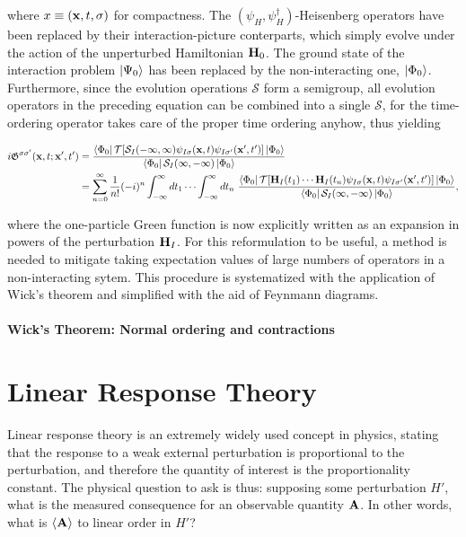 \documentclass{homework}
\begin{document}
where $x \equiv ({\bf x}, t, \sigma)$ for compactness. The $(\psi_H, \psi_H^\dagger)$-Heisenberg operators have been replaced by their interaction-picture conterparts, which simply evolve under the action of the unperturbed Hamiltonian ${\bf H}_0$. The ground state of the interaction problem $\ket{\Psi_0}$ has been replaced by the non-interacting one, $\ket{\Phi_0}$. Furthermore, since the evolution operations $\mathcal{S}$ form a semigroup, all evolution operators in the preceding equation can be combined into a single $\mathcal{S}$, for the time-ordering operator takes care of the proper time ordering anyhow, thus yielding 

\begin{equation}
\begin{split}
     i \mathfrak{G}^{\sigma \sigma'}({\bf x}, t; {\bf x}', t') &= \frac{\bra{\Phi_0}  \mathcal{T} [\mathcal{S}_I(-\infty, \infty) \psi_{I \sigma}({\bf x}, t)\psi_{I \sigma'}({\bf x}', t')]\ket{\Phi_0}}{\bra{\Phi_0} \mathcal{S}_I(\infty, -\infty)\ket{\Phi_0}} \\
     &= \sum_{n=0}^{\infty} \frac{1}{n!} (-i)^n \int_{-\infty}^{\infty} dt_1 \cdots \int_{-\infty}^{\infty} dt_n \textnormal{ } \frac{\bra{\Phi_0} \mathcal{T} [{\bf H}_{I}(t_1) \cdots {\bf H}_{I}(t_n) \psi_{I \sigma}({\bf x}, t)\psi_{I \sigma'}({\bf x}', t')]\ket{\Phi_0}}{\bra{\Phi_0} \mathcal{S}_I(\infty, -\infty)\ket{\Phi_0}},
\end{split}
\end{equation}

where the one-particle Green function is now explicitly written as an expansion in powers of the perturbation ${\bf H}_I$. For this reformulation to be useful, a method is needed to mitigate taking expectation values of large numbers of operators in a non-interacting sytem. This procedure is systematized with the application of Wick's theorem and simplified with the aid of Feynmann diagrams. \\

\paragraph{Wick's Theorem: Normal ordering and contractions}

\clearpage

\section{Linear Response Theory}

Linear response theory is an extremely widely used concept in physics, stating that the response to a weak external perturbation is proportional to the perturbation, and therefore the quantity of interest is the proportionality constant. The physical question to ask is thus: supposing some perturbation $H'$, what is the measured consequence for an observable quantity ${\bf A}$. In other words, what is $\langle {\bf A} \rangle$ to linear order in $H'$? 
\end{document}

